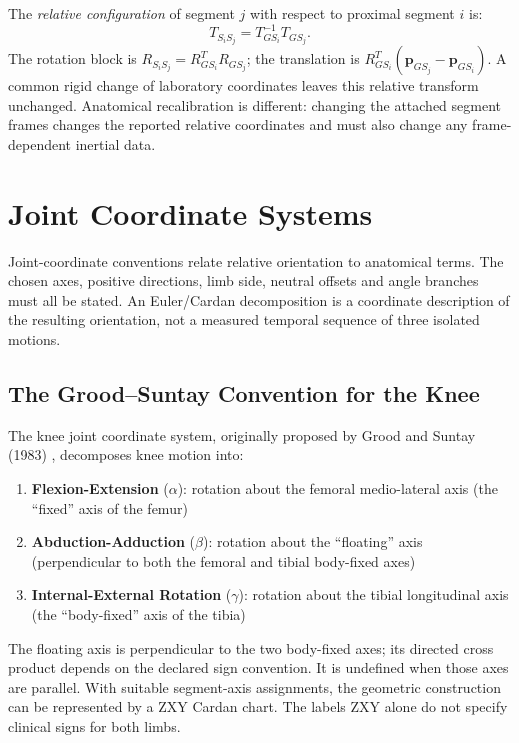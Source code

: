 The \emph{relative configuration} of segment $j$ with respect to proximal segment $i$
is:
\begin{equation}
  T_{S_i S_j} = T_{GS_i}^{-1} T_{GS_j}.
  \label{eq:ch2:relative-config}
\end{equation}
The rotation block is $R_{S_iS_j}=R_{GS_i}^T R_{GS_j}$; the translation is
$R_{GS_i}^T(\bm{p}_{GS_j}-\bm{p}_{GS_i})$. A common rigid change of laboratory
coordinates leaves this relative transform unchanged. Anatomical recalibration
is different: changing the attached segment frames changes the reported
relative coordinates and must also change any frame-dependent inertial data.

\section{Joint Coordinate Systems}

Joint-coordinate conventions relate relative orientation to anatomical terms.
The chosen axes, positive directions, limb side, neutral offsets and angle
branches must all be stated. An Euler/Cardan decomposition is a coordinate
description of the resulting orientation, not a measured temporal sequence
of three isolated motions.

\subsection{The Grood--Suntay Convention for the Knee}

The knee joint coordinate system, originally proposed by Grood and Suntay (1983)
\cite{GroodSuntay1983}, decomposes knee motion into:

\begin{enumerate}
  \item \textbf{Flexion-Extension} ($\alpha$): rotation about the femoral medio-lateral
        axis (the ``fixed'' axis of the femur)
  \item \textbf{Abduction-Adduction} ($\beta$): rotation about the ``floating'' axis
        (perpendicular to both the femoral and tibial body-fixed axes)
  \item \textbf{Internal-External Rotation} ($\gamma$): rotation about the tibial
        longitudinal axis (the ``body-fixed'' axis of the tibia)
\end{enumerate}

The floating axis is perpendicular to the two body-fixed axes; its directed
cross product depends on the declared sign convention. It is undefined when
those axes are parallel. With suitable segment-axis assignments, the
geometric construction can be represented by a ZXY Cardan chart. The labels
ZXY alone do not specify clinical signs for both limbs.

